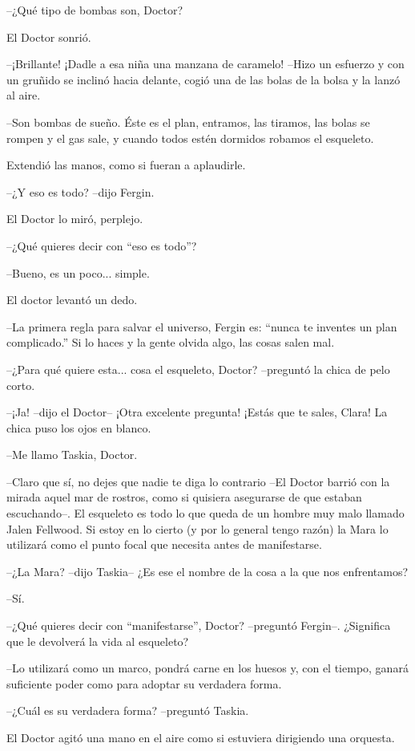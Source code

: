 --¿Qué tipo de bombas son, Doctor?

El Doctor sonrió. 

--¡Brillante! ¡Dadle a esa niña una manzana de caramelo! --Hizo un esfuerzo y con un gruñido se inclinó hacia delante, cogió una de las bolas de la bolsa y la lanzó al aire.

--Son bombas de sueño. Éste es el plan, entramos, las tiramos, las bolas se rompen y el gas sale, y cuando todos estén dormidos robamos el esqueleto.

Extendió las manos, como si fueran a aplaudirle.

--¿Y eso es todo? --dijo Fergin.

El Doctor lo miró, perplejo. 

--¿Qué quieres decir con ``eso es todo''?

--Bueno, es un poco... simple.

El doctor levantó un dedo. 

--La primera regla para salvar el universo, Fergin es: ``nunca te inventes un plan complicado.'' Si lo haces y la gente olvida algo, las cosas salen mal.

--¿Para qué quiere esta... cosa el esqueleto, Doctor? --preguntó la chica de pelo corto.

--¡Ja! --dijo el Doctor-- ¡Otra excelente pregunta! ¡Estás que te sales, Clara!
La chica puso los ojos en blanco. 

--Me llamo Taskia, Doctor.

--Claro que sí, no dejes que nadie te diga lo contrario --El Doctor barrió con la mirada aquel mar de rostros, como si quisiera asegurarse de que estaban escuchando--. El esqueleto es todo lo que queda de un hombre muy malo llamado Jalen Fellwood. Si estoy en lo cierto (y por lo general tengo razón) la Mara lo utilizará como el punto focal que necesita antes de manifestarse.

--¿La Mara? --dijo Taskia-- ¿Es ese el nombre de la cosa a la que nos enfrentamos?

--Sí.

--¿Qué quieres decir con ``manifestarse'', Doctor? --preguntó Fergin--. ¿Significa que le devolverá la vida al esqueleto?

--Lo utilizará como un marco, pondrá carne en los huesos y, con el tiempo, ganará suficiente poder como para adoptar su verdadera forma.

--¿Cuál es su verdadera forma? --preguntó Taskia.

El Doctor agitó una mano en el aire como si estuviera dirigiendo una orquesta. 

